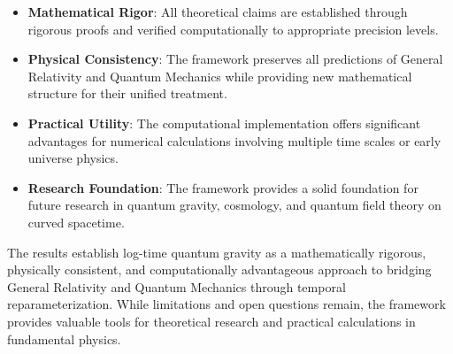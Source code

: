 \begin{itemize}
\item \textbf{Mathematical Rigor}: All theoretical claims are established through rigorous proofs and verified computationally to appropriate precision levels.

\item \textbf{Physical Consistency}: The framework preserves all predictions of General Relativity and Quantum Mechanics while providing new mathematical structure for their unified treatment.

\item \textbf{Practical Utility}: The computational implementation offers significant advantages for numerical calculations involving multiple time scales or early universe physics.

\item \textbf{Research Foundation}: The framework provides a solid foundation for future research in quantum gravity, cosmology, and quantum field theory on curved spacetime.
\end{itemize}

The results establish log-time quantum gravity as a mathematically rigorous, physically consistent, and computationally advantageous approach to bridging General Relativity and Quantum Mechanics through temporal reparameterization. While limitations and open questions remain, the framework provides valuable tools for theoretical research and practical calculations in fundamental physics.